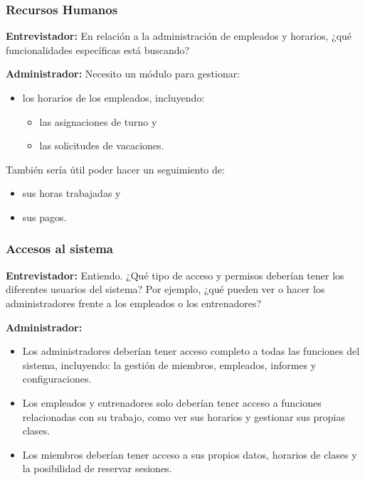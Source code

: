 \documentclass[spanish, 12pt]{article}
\providecommand{\tightlist}{\setlength{\itemsep}{0pt}
\setlength{\parskip}{0pt}}
\begin{document}
	\subsubsection{Recursos Humanos}
	\label{recursos-humanos}

	\textbf{Entrevistador:} En relación a la administración de empleados y horarios,
	¿qué funcionalidades específicas está buscando?

	\textbf{Administrador:} Necesito un módulo para gestionar:

	\begin{itemize}
		\tightlist

		\item los horarios de los empleados, incluyendo:

			\begin{itemize}
				\tightlist

				\item las asignaciones de turno y

				\item las solicitudes de vacaciones.
			\end{itemize}
	\end{itemize}

	También sería útil poder hacer un seguimiento de:

	\begin{itemize}
		\tightlist

		\item sus horas trabajadas y

		\item sus pagos.
	\end{itemize}

	\subsubsection{Accesos al sistema}
	\label{accesos-al-sistema}

	\textbf{Entrevistador:} Entiendo. ¿Qué tipo de acceso y permisos deberían
	tener los diferentes usuarios del sistema? Por ejemplo, ¿qué pueden ver o
	hacer los administradores frente a los empleados o los entrenadores?

	\textbf{Administrador:}

	\begin{itemize}
		\tightlist

		\item Los administradores deberían tener acceso completo a todas las funciones
			del sistema, incluyendo: la gestión de miembros, empleados, informes y configuraciones.

		\item Los empleados y entrenadores solo deberían tener acceso a funciones relacionadas
			con su trabajo, como ver sus horarios y gestionar sus propias clases.

		\item Los miembros deberían tener acceso a sus propios datos, horarios de
			clases y la posibilidad de reservar sesiones.
	\end{itemize}
\end{document}
